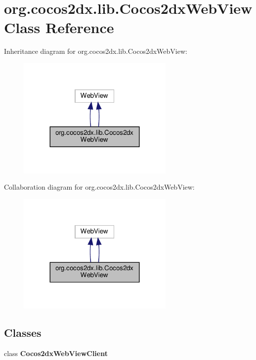 \hypertarget{classorg_1_1cocos2dx_1_1lib_1_1Cocos2dxWebView}{}\section{org.\+cocos2dx.\+lib.\+Cocos2dx\+Web\+View Class Reference}
\label{classorg_1_1cocos2dx_1_1lib_1_1Cocos2dxWebView}


Inheritance diagram for org.\+cocos2dx.\+lib.\+Cocos2dx\+Web\+View\+:
\nopagebreak
\begin{figure}[H]
\begin{center}
\leavevmode
\includegraphics[width=215pt]{classorg_1_1cocos2dx_1_1lib_1_1Cocos2dxWebView__inherit__graph}
\end{center}
\end{figure}


Collaboration diagram for org.\+cocos2dx.\+lib.\+Cocos2dx\+Web\+View\+:
\nopagebreak
\begin{figure}[H]
\begin{center}
\leavevmode
\includegraphics[width=215pt]{classorg_1_1cocos2dx_1_1lib_1_1Cocos2dxWebView__coll__graph}
\end{center}
\end{figure}
\subsection*{Classes}
\begin{DoxyCompactItemize}
\item 
class {\bfseries Cocos2dx\+Web\+View\+Client}
\end{DoxyCompactItemize}
